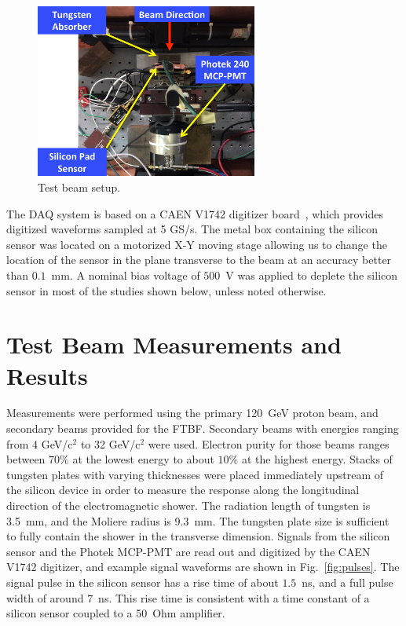 \documentclass[12pt]{article}
\begin{document}
{\begin{figure}[htbp] 
\centering
\includegraphics[width=0.65\textwidth]{plots/BeamPhotoDiagram.pdf} 
\caption{Test beam setup.} 
\label{fig:BeamPhotoDiagram} 
\end{figure} 

The DAQ system is based on a CAEN V1742 digitizer board~\cite{CAENDRS}, which
provides digitized waveforms sampled at 5 GS/s. The metal box containing the
silicon sensor was located on a motorized X-Y moving stage allowing us to change
the location of the sensor in the plane transverse to the beam at an accuracy
better than $0.1$~mm. A nominal bias voltage of $500$~V was applied to deplete
the silicon sensor in most of the studies shown below, unless noted otherwise.


\section{Test Beam Measurements and Results} 
\label{sec:results} 

Measurements were performed using the primary 120~GeV proton beam, and secondary
beams provided for the FTBF. Secondary beams with energies ranging from 4
GeV/c$^2$ to 32 GeV/c$^2$ were used. Electron purity for those beams ranges
between $70\%$ at the lowest energy to about $10\%$ at the highest energy.
Stacks of tungsten plates with varying thicknesses were placed immediately
upstream of the silicon device in order to measure the response along the
longitudinal direction of the electromagnetic shower. The radiation length of
tungsten is 3.5~mm, and the Moliere radius is 9.3~mm. The tungsten plate size is
sufficient to fully contain the shower in the transverse dimension. Signals from
the silicon sensor and the Photek MCP-PMT are read out and digitized by the CAEN
V1742 digitizer, and example signal waveforms are shown in
Fig.~\ref{fig:pulses}. The signal pulse in the silicon sensor has a rise time of
about $1.5$~ns, and a full pulse width of around $7$~ns. This rise time is
consistent with a time constant of a silicon sensor coupled to a 50~Ohm amplifier.

}
\end{document}
